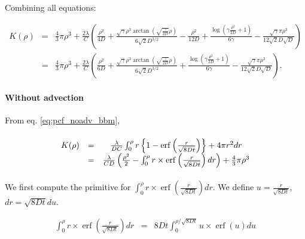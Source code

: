 \documentclass[english]{article}
\DeclareMathOperator\erf{erf}
\begin{document}
Combining all equations:

\begin{equation}
\begin{array}{ccc}
K(\rho) & = & \frac{4}{3}\pi\rho^{3}+\frac{2\lambda}{C}\left(\frac{\rho^{2}}{4D}+\frac{\sqrt{\gamma}\rho^{3}\arctan(\sqrt{\frac{\gamma}{2D}}\rho)}{6\sqrt{2}D^{3/2}}-\frac{\rho^{2}}{12D}+\frac{\log\left(\gamma\frac{\rho^{2}}{2D}+1\right)}{6\gamma}-\frac{\sqrt{\gamma}\pi\rho^{3}}{12\sqrt{2}D\sqrt{D}}\right)\\
 & = & \frac{4}{3}\pi\rho^{3}+\frac{2\lambda}{C}\left(\frac{\rho^{2}}{6D}+\frac{\sqrt{\gamma}\rho^{3}\arctan(\sqrt{\frac{\gamma}{2D}}\rho)}{6\sqrt{2}D^{3/2}}+\frac{\log\left(\gamma\frac{\rho^{2}}{2D}+1\right)}{6\gamma}-\frac{\sqrt{\gamma}\pi\rho^{3}}{12\sqrt{2}D\sqrt{D}}\right).
\end{array}
\end{equation}


\paragraph{Without advection}

From eq. \ref{eq:pcf_noadv_bbm},

\paragraph{
\begin{equation}
\protect\begin{array}{ccc}
K(\rho) & = & \frac{\lambda}{DC}\int_{0}^{\rho}r\left\{ 1-\erf\left(\frac{r}{\sqrt{8Dt}}\right)\right\} +4\pi r^{2}dr\protect\\
 & = & \frac{\lambda}{CD}\left(\frac{\rho^{2}}{2}-\int_{0}^{\rho}r\times\erf\left(\frac{r}{\sqrt{8Dt}}\right)dr\right)+\frac{4}{3}\pi\rho^{3}
\protect\end{array}
\end{equation}
}

We first compute the primitive for $\int_{0}^{\rho}r\times\erf\left(\frac{r}{\sqrt{8Dt}}\right)dr$.
We define $u=\frac{r}{\sqrt{8Dt}}$, $dr=\sqrt{8Dt}du$.

\begin{equation}
\begin{array}{ccc}
\int_{0}^{\rho}r\times\erf\left(\frac{r}{\sqrt{8Dt}}\right)dr & = & 8Dt\int_{0}^{\rho/\sqrt{8Dt}}u\times\erf\left(u\right)du\end{array}
\end{equation}
\end{document}
